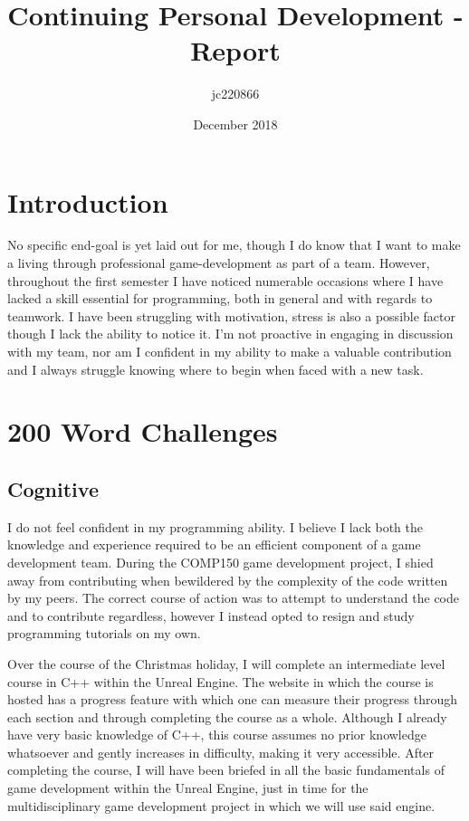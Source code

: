 \documentclass{article}
\title{Continuing Personal Development - Report}
\author{jc220866}
\date{December 2018}
\begin{document}
    \maketitle
    
\section{Introduction}

No specific end-goal is yet laid out for me, though I do know that I want to make a living through professional game-development as part of a team.
However, throughout the first semester I have noticed numerable occasions where I have lacked a skill essential for programming, both in general and with regards to teamwork.
I have been struggling with motivation, stress is also a possible factor though I lack the ability to notice it.
I'm not proactive in engaging in discussion with my team, nor am I confident in my ability to make a valuable contribution and I always struggle knowing where to begin when faced with a new task.

\newpage

\section{200 Word Challenges}
\subsection{Cognitive}

I do not feel confident in my programming ability.
I believe I lack both the knowledge and experience required to be an efficient component of a game development team.
During the COMP150 game development project, I shied away from contributing when bewildered by the complexity of the code written by my peers.
The correct course of action was to attempt to understand the code and to contribute regardless, however I instead opted to resign and study programming tutorials on my own.

Over the course of the Christmas holiday, I will complete an intermediate level course in C++ within the Unreal Engine.
The website in which the course is hosted has a progress feature with which one can measure their progress through each section and through completing the course as a whole.
Although I already have very basic knowledge of C++, this course assumes no prior knowledge whatsoever and gently increases in difficulty, making it very accessible.
After completing the course, I will have been briefed in all the basic fundamentals of game development within the Unreal Engine, just in time for the multidisciplinary game development project in which we will use said engine.
\end{document}
